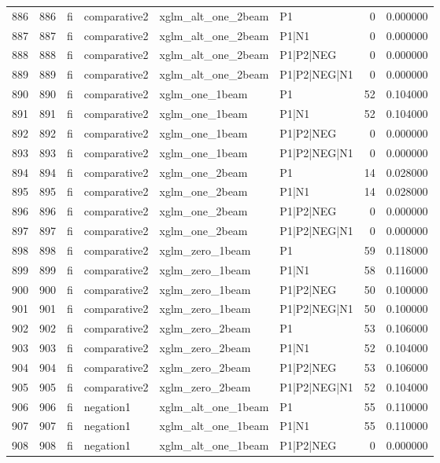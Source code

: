 \begin{tabular}{lrllllrr}
886 & 886 & fi & comparative2 & xglm_alt_one_2beam & P1 & 0 & 0.000000 \\
887 & 887 & fi & comparative2 & xglm_alt_one_2beam & P1|N1 & 0 & 0.000000 \\
888 & 888 & fi & comparative2 & xglm_alt_one_2beam & P1|P2|NEG & 0 & 0.000000 \\
889 & 889 & fi & comparative2 & xglm_alt_one_2beam & P1|P2|NEG|N1 & 0 & 0.000000 \\
890 & 890 & fi & comparative2 & xglm_one_1beam & P1 & 52 & 0.104000 \\
891 & 891 & fi & comparative2 & xglm_one_1beam & P1|N1 & 52 & 0.104000 \\
892 & 892 & fi & comparative2 & xglm_one_1beam & P1|P2|NEG & 0 & 0.000000 \\
893 & 893 & fi & comparative2 & xglm_one_1beam & P1|P2|NEG|N1 & 0 & 0.000000 \\
894 & 894 & fi & comparative2 & xglm_one_2beam & P1 & 14 & 0.028000 \\
895 & 895 & fi & comparative2 & xglm_one_2beam & P1|N1 & 14 & 0.028000 \\
896 & 896 & fi & comparative2 & xglm_one_2beam & P1|P2|NEG & 0 & 0.000000 \\
897 & 897 & fi & comparative2 & xglm_one_2beam & P1|P2|NEG|N1 & 0 & 0.000000 \\
898 & 898 & fi & comparative2 & xglm_zero_1beam & P1 & 59 & 0.118000 \\
899 & 899 & fi & comparative2 & xglm_zero_1beam & P1|N1 & 58 & 0.116000 \\
900 & 900 & fi & comparative2 & xglm_zero_1beam & P1|P2|NEG & 50 & 0.100000 \\
901 & 901 & fi & comparative2 & xglm_zero_1beam & P1|P2|NEG|N1 & 50 & 0.100000 \\
902 & 902 & fi & comparative2 & xglm_zero_2beam & P1 & 53 & 0.106000 \\
903 & 903 & fi & comparative2 & xglm_zero_2beam & P1|N1 & 52 & 0.104000 \\
904 & 904 & fi & comparative2 & xglm_zero_2beam & P1|P2|NEG & 53 & 0.106000 \\
905 & 905 & fi & comparative2 & xglm_zero_2beam & P1|P2|NEG|N1 & 52 & 0.104000 \\
906 & 906 & fi & negation1 & xglm_alt_one_1beam & P1 & 55 & 0.110000 \\
907 & 907 & fi & negation1 & xglm_alt_one_1beam & P1|N1 & 55 & 0.110000 \\
908 & 908 & fi & negation1 & xglm_alt_one_1beam & P1|P2|NEG & 0 & 0.000000 \\

\end{tabular}
